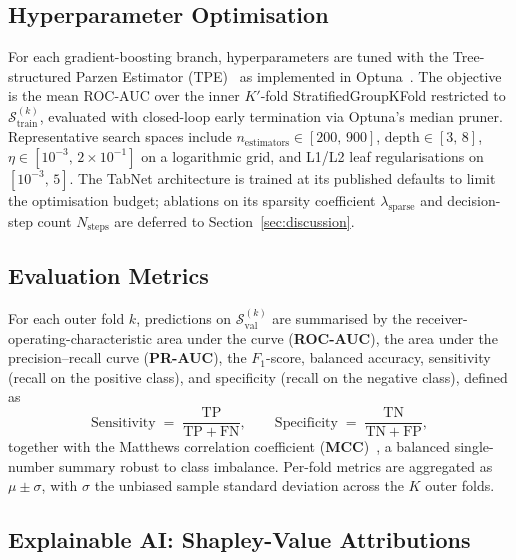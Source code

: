 \subsection{Hyperparameter Optimisation}
\label{subsec:tuning}

For each gradient-boosting branch, hyperparameters are tuned with the Tree-structured Parzen Estimator (TPE)~\cite{bergstra2011tpe} as implemented in Optuna~\cite{akiba2019optuna}. The objective is the mean ROC-AUC over the inner $K'$-fold StratifiedGroupKFold restricted to $\mathcal{S}_\mathrm{train}^{(k)}$, evaluated with closed-loop early termination via Optuna's median pruner. Representative search spaces include $n_{\mathrm{estimators}} \in [200,\,900]$, $\mathrm{depth} \in [3,\,8]$, $\eta \in [10^{-3},\,2 \times 10^{-1}]$ on a logarithmic grid, and L1/L2 leaf regularisations on $[10^{-3},\,5]$. The TabNet architecture is trained at its published defaults to limit the optimisation budget; ablations on its sparsity coefficient $\lambda_{\mathrm{sparse}}$ and decision-step count $N_{\mathrm{steps}}$ are deferred to Section~\ref{sec:discussion}.

\subsection{Evaluation Metrics}
\label{subsec:metrics}

For each outer fold $k$, predictions on $\mathcal{S}_\mathrm{val}^{(k)}$ are summarised by the receiver-operating-characteristic area under the curve (\textbf{ROC-AUC}), the area under the precision--recall curve (\textbf{PR-AUC}), the $F_1$-score, balanced accuracy, sensitivity (recall on the positive class), and specificity (recall on the negative class), defined as
\begin{equation}
\mathrm{Sensitivity} \;=\; \frac{\mathrm{TP}}{\mathrm{TP}+\mathrm{FN}}, \qquad \mathrm{Specificity} \;=\; \frac{\mathrm{TN}}{\mathrm{TN}+\mathrm{FP}},
\end{equation}
together with the Matthews correlation coefficient (\textbf{MCC})~\cite{matthews1975}, a balanced single-number summary robust to class imbalance. Per-fold metrics are aggregated as $\mu \pm \sigma$, with $\sigma$ the unbiased sample standard deviation across the $K$ outer folds.

\subsection{Explainable AI: Shapley-Value Attributions}
\label{subsec:xai}


